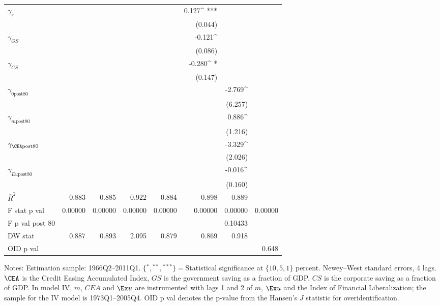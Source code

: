 \begin{table}
\begin{center}
\begin{tabular}{@{}ld{6}d{6}d{6}d{6}d{6}d{6}d{6}@{}}
 $\gamma_{r}$  &   & & & & 0.127^{ ***}  & & \\
 &   &  & & & (0.044)  & & \\
 $\gamma_{GS}$  &   & & & & -0.121^{ }  & & \\
 &   &  & & & (0.086)  &  & \\
 $\gamma_{CS}$  &   & & & &-0.280^{ *}  & & \\
 &   &  & & & (0.147)  & & \\
 $\gamma_{\text{0post80}}$  &   & & & & &-2.769^{ }  &  \\
 &   &  & & & & (6.257)   & \\
 $\gamma_{m\text{post80}}$  &   & & & & &0.886^{ }  &  \\
 &   &  & &  & &(1.216)  &  \\
 $\gamma_{\CEA\text{post80}}$  &   & & & & &-3.329^{ }  & \\
 &   &  & & & &(2.026)  & \\
 $\gamma_{Eu\text{post80}}$  &   & & & & &-0.016^{ }  &  \\
 &   &  & &  & & (0.160)  &  \\
\midrule
 $\bar{R}^2$  & 0.883  & 0.885  & 0.922  & 0.884  & 0.898  & 0.889  & \\
 F stat p val  & 0.00000  & 0.00000  & 0.00000  & 0.00000  & 0.00000  & 0.00000  & 0.00000\\
 F p val post 80 &  & & & & & 0.10433  &  \\
DW stat  & 0.887  & 0.893  & 2.095  & 0.879  & 0.869  & 0.918 & \\
OID p val &  & & & &  & & 0.648\\
\bottomrule
\end{tabular}
\end{center}
 {\footnotesize Notes: Estimation sample: 1966Q2--2011Q1. $\{{}^*,{}^{**},{}^{***}\}={}$Statistical significance at $\{10,5,1\}$ percent. Newey--West standard errors, 4 lags. $\CEA$ is the Credit Easing Accumulated Index, $GS$ is the government saving as a fraction of GDP, $CS$ is the corporate saving as a fraction of GDP. In model IV, $m$, $CEA$ and $\Ex u$ are instrumented with lags 1 and 2 of $m$, $\Ex u$ and the \cite{abiadEtAl_FinReforms} Index of Financial Liberalization; the sample for the IV model is 1973Q1--2005Q4. OID p val denotes the p-value from the Hansen's $J$ statistic for overidentification.}
\end{table}
